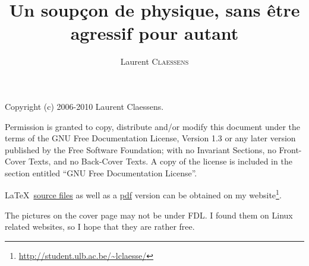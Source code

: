 
\thispagestyle{empty}
\title{Un soupçon de physique, sans être agressif pour autant}
\author{Laurent \textsc{Claessens}}
\maketitle

Copyright (c) 2006-2010  Laurent Claessens.

Permission is granted to copy, distribute and/or modify this document under the terms of the GNU Free Documentation License, Version 1.3 or any later version published by the Free Software Foundation; with no Invariant Sections, no Front-Cover Texts, and no Back-Cover Texts. A copy of the license is included in the section entitled ``GNU Free Documentation License''.

\LaTeX\ \href{http://student.ulb.ac.be/~lclaesse/echa.tar.gz}{source files} as well as a \href{http://student.ulb.ac.be/~lclaesse/echa.pdf}{pdf} version can be obtained on my website\footnote{\url{http://student.ulb.ac.be/~lclaesse/}}.

\vspace{0.5cm}
The pictures on the cover page may not be under FDL. I found them on Linux related websites, so I hope that they are rather free.


